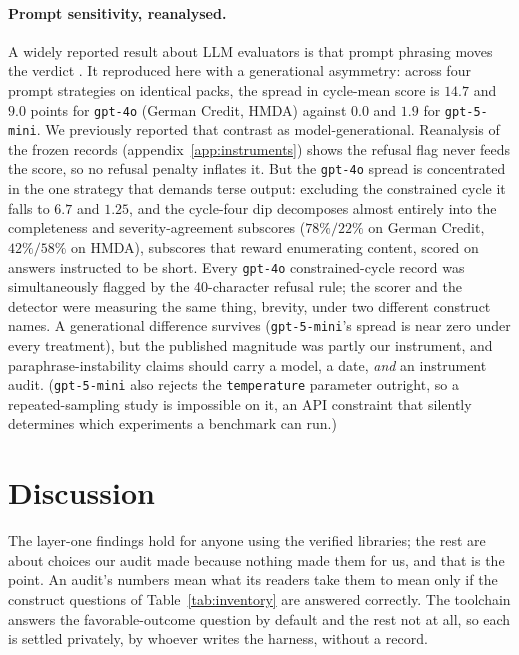 \documentclass[sigconf,nonacm]{acmart}
\begin{document}
\paragraph{Prompt sensitivity, reanalysed.} A widely reported result about LLM
evaluators is that prompt phrasing moves the verdict \citep{sclar2024}. It
reproduced here with a generational asymmetry: across four prompt strategies
on identical packs, the spread in cycle-mean score is $14.7$ and $9.0$ points
for \texttt{gpt-4o} (German Credit, HMDA) against $0.0$ and $1.9$ for
\texttt{gpt-5-mini}. We previously reported that contrast as
model-generational. Reanalysis of the frozen records
(appendix~\ref{app:instruments}) shows the refusal flag never feeds the score,
so no refusal penalty inflates it. But the \texttt{gpt-4o} spread is
concentrated in the one strategy that demands terse output: excluding the
constrained cycle it falls to $6.7$ and $1.25$, and the cycle-four dip
decomposes almost entirely into the completeness and severity-agreement
subscores ($78\%/22\%$ on German Credit, $42\%/58\%$ on HMDA), subscores
that reward enumerating content, scored on answers instructed to be short.
Every \texttt{gpt-4o} constrained-cycle record was simultaneously flagged by
the 40-character refusal rule; the scorer and the detector were measuring the
same thing, brevity, under two different construct names. A generational
difference survives (\texttt{gpt-5-mini}'s spread is near zero under every
treatment), but the published magnitude was partly our instrument, and
paraphrase-instability claims should carry a model, a date, \emph{and} an
instrument audit. (\texttt{gpt-5-mini} also rejects the \texttt{temperature}
parameter outright, so a repeated-sampling study is impossible on it, an
API constraint that silently determines which experiments a benchmark can
run.)

\section{Discussion}
\label{sec:invisible}

The layer-one findings hold for anyone using the verified libraries; the rest
are about choices our audit made because nothing made them for us, and that
is the point. An audit's numbers mean what its readers take them to mean only
if the construct questions of Table~\ref{tab:inventory} are answered
correctly. The toolchain answers the favorable-outcome question by default
and the rest not at all, so each is settled privately, by whoever writes the
harness, without a record.
\end{document}
